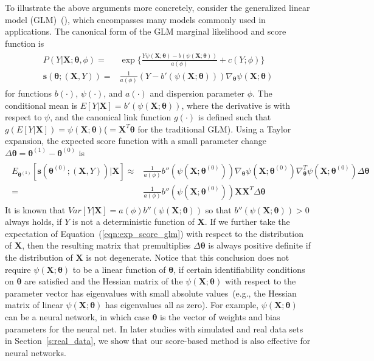 \documentclass[twoside,11pt]{article}
\begin{document}
To illustrate the above arguments more concretely, consider the generalized linear model (GLM)~(\cite{nelder1972generalized}), which encompasses many models commonly used in applications. The canonical form of the GLM marginal likelihood and score function is
\begin{align}
\begin{aligned}
P(Y|\bm{X};\bm { \theta}, \phi) =& \exp\big\{\frac{Y \psi(\bm{X};\bm { \theta})-b( \psi(\bm{X};\bm { \theta}))}{ a ( \phi)} + c(Y; \phi)\big\} \\
\bm {s}(\bm { \theta};(\bm {X}, Y)) =& \frac{1}{a( \phi)}(Y - b'( \psi (\bm{X};\bm { \theta} )))\nabla _{ \bm { \theta}} \psi(\bm{X};\bm { \theta} )
\end{aligned}
\label{eqn:score_glm}
\end{align}
for functions $b(\cdot)$, $ \psi(\cdot)$, and $a(\cdot)$ and dispersion parameter $\phi$. The conditional mean is $E[Y|\bm{X}]=b'(\psi(\bm{X};\bm{\theta}))$, where the derivative is with respect to $\psi$, and the canonical link function $g(\cdot)$ is defined such that $g(E[Y|\bm{X}])=\psi(\bm{X};\bm{\theta})$($=\bm{X}^T\bm{\theta}$ for the traditional GLM). Using a Taylor expansion, the expected score function with a small parameter change $ \Delta \bm { \theta}= \bm { \theta}^{(1)}-\bm { \theta}^{(0)}$ is
\begin{align}
\begin{aligned}
E _{\bm { \theta} ^{(1)}}[\bm {s}(\bm { \theta} ^{(0)};(\bm {X}, Y))|\bm{X}] \approx& \frac{1}{a ( \phi)}b''( \psi(\bm{X}; \bm { \theta} ^{(0)}))\nabla _{ \bm { \theta}} \psi (\bm{X}; \bm { \theta} ^{ (0)}) \nabla _{\bm { \theta}}^T \psi (\bm{X}; \bm { \theta} ^{ (0)}) \Delta \bm { \theta} \\
=& \frac{1}{a ( \phi)}b''( \psi(\bm{X}; \bm { \theta} ^{(0)}))\bm {X}\bm {X}^T \Delta \bm { \theta}
\end{aligned}
\label{eqn:exp_score_glm}
\end{align}
It is known that $Var[Y|\bm{X}] = a ( \phi)b''(\psi (\bm{X}; \bm { \theta} ))$ so that $b''(\psi (\bm{X}; \bm { \theta} ))>0$ always holds, if $Y$ is not a deterministic function of $\bm{X}$. If we further take the expectation of Equation~(\ref{eqn:exp_score_glm}) with respect to the distribution of $\bm{X}$, then the resulting matrix that premultiplies $\Delta\bm{\theta}$ is always positive definite if the distribution of $\bm{X}$ is not degenerate. Notice that this conclusion does not require $ \psi (\bm{X}; \bm { \theta})$ to be a linear function of $\bm { \theta}$, if certain identifiability conditions on $\bm{\theta}$ are satisfied and the Hessian matrix of the $\psi(\bm{X};\bm{\theta})$ with respect to the parameter vector has eigenvalues with small absolute values~(e.g., the Hessian matrix of linear $\psi(\bm{X};\bm{\theta})$ has eigenvalues all as zero). For example, $ \psi (\bm{X}; \bm { \theta})$ can be a neural network, in which case $\bm { \theta}$ is the vector of weights and bias parameters for the neural net. In later studies with simulated and real data sets in Section~\ref{s:real_data}, we show that our score-based method is also effective for neural networks.
\end{document}
